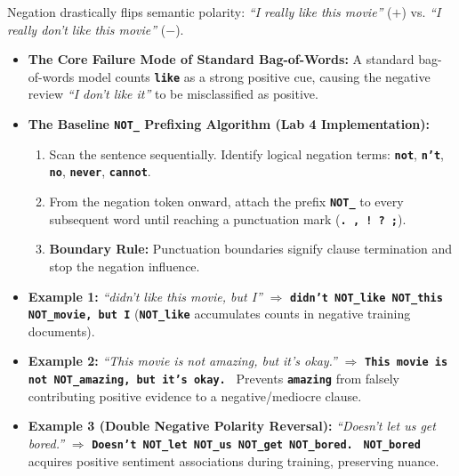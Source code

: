 \documentclass[10pt,a4paper]{article}
\newcommand{\rx}[1]{\texttt{\bfseries\color{inlinecode}#1}}
\newcommand{\cmark}{\textcolor{accentgreen}{\textbf{\checkmark}}}
\begin{document}
\par\vspace{1pt}
Negation drastically flips semantic polarity: \textit{``I really like this movie''} ($+$) vs. \textit{``I really don't like this movie''} ($-$).
\begin{itemize}[leftmargin=12pt, itemsep=0.5pt, parsep=0pt, topsep=0.5pt]
    \item \textbf{The Core Failure Mode of Standard Bag-of-Words:} A standard bag-of-words model counts \rx{like} as a strong positive cue, causing the negative review \textit{``I don't like it''} to be misclassified as positive.
    \item \textbf{The Baseline \rx{NOT\_} Prefixing Algorithm (Lab 4 Implementation):}
    \begin{enumerate}[leftmargin=14pt, itemsep=0.5pt, parsep=0pt]
        \item Scan the sentence sequentially. Identify logical negation terms: \rx{not}, \rx{n't}, \rx{no}, \rx{never}, \rx{cannot}.
        \item From the negation token onward, attach the prefix \rx{NOT\_} to every subsequent word until reaching a punctuation mark (\rx{. , ! ? ;}).
        \item \textbf{Boundary Rule:} Punctuation boundaries signify clause termination and stop the negation influence.
    \end{enumerate}
\end{itemize}

\vspace{-2pt}

\begin{insightbox}[title={\bfseries\sffamily Worked Negation Transformation Examples (Lab 4 Test Cases)}]
\footnotesize
\begin{itemize}[leftmargin=12pt, itemsep=1pt, parsep=0pt, topsep=0.5pt]
    \item \textbf{Example 1:} \textit{``didn't like this movie, but I''} $\Longrightarrow$ \rx{didn't NOT\_like NOT\_this NOT\_movie, but I} (\rx{NOT\_like} accumulates counts in negative training documents).
    \item \textbf{Example 2:} \textit{``This movie is not amazing, but it's okay.''} $\Longrightarrow$ \rx{This movie is not NOT\_amazing, but it's okay.}
    \newline \cmark\ Prevents \rx{amazing} from falsely contributing positive evidence to a negative/mediocre clause.
    \item \textbf{Example 3 (Double Negative Polarity Reversal):} \textit{``Doesn't let us get bored.''} $\Longrightarrow$ \rx{Doesn't NOT\_let NOT\_us NOT\_get NOT\_bored.}
    \newline \cmark\ \rx{NOT\_bored} acquires positive sentiment associations during training, preserving nuance.
\end{itemize}
\end{insightbox}
\end{document}

